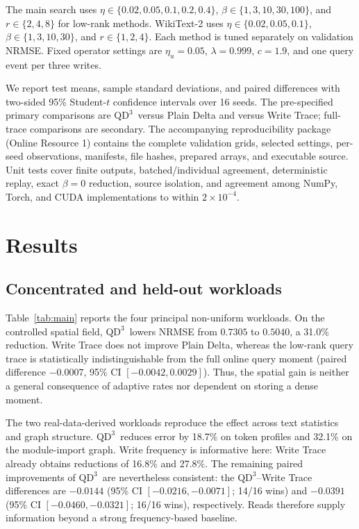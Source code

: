 \documentclass[pdflatex,sn-mathphys-num]{sn-jnl}
\theoremstyle{thmstyleone}
\newcommand{\QDDD}{\ensuremath{\mathrm{QD}^{3}}}
\begin{document}
The main search uses $\eta\in\{0.02,0.05,0.1,0.2,0.4\}$, $\beta\in\{1,3,10,30,100\}$, and $r\in\{2,4,8\}$ for low-rank methods. WikiText-2 uses $\eta\in\{0.02,0.05,0.1\}$, $\beta\in\{1,3,10,30\}$, and $r\in\{1,2,4\}$. Each method is tuned separately on validation NRMSE. Fixed operator settings are $\eta_u=0.05$, $\lambda=0.999$, $c=1.9$, and one query event per three writes.

We report test means, sample standard deviations, and paired differences with two-sided 95\% Student-$t$ confidence intervals over 16 seeds. The pre-specified primary comparisons are \QDDD\ versus Plain Delta and versus Write Trace; full-trace comparisons are secondary. The accompanying reproducibility package (Online Resource 1) contains the complete validation grids, selected settings, per-seed observations, manifests, file hashes, prepared arrays, and executable source. Unit tests cover finite outputs, batched/individual agreement, deterministic replay, exact $\beta=0$ reduction, source isolation, and agreement among NumPy, Torch, and CUDA implementations to within $2\times10^{-4}$.

\section{Results}\label{sec:results}

\subsection{Concentrated and held-out workloads}

Table~\ref{tab:main} reports the four principal non-uniform workloads. On the controlled spatial field, \QDDD\ lowers NRMSE from $0.7305$ to $0.5040$, a 31.0\% reduction. Write Trace does not improve Plain Delta, whereas the low-rank query trace is statistically indistinguishable from the full online query moment (paired difference $-0.0007$, 95\% CI $[-0.0042,0.0029]$). Thus, the spatial gain is neither a general consequence of adaptive rates nor dependent on storing a dense moment.

The two real-data-derived workloads reproduce the effect across text statistics and graph structure. \QDDD\ reduces error by 18.7\% on token profiles and 32.1\% on the module-import graph. Write frequency is informative here: Write Trace already obtains reductions of 16.8\% and 27.8\%. The remaining paired improvements of \QDDD\ are nevertheless consistent: the \QDDD--Write Trace differences are $-0.0144$ (95\% CI $[-0.0216,-0.0071]$; 14/16 wins) and $-0.0391$ (95\% CI $[-0.0460,-0.0321]$; 16/16 wins), respectively. Reads therefore supply information beyond a strong frequency-based baseline.
\end{document}
